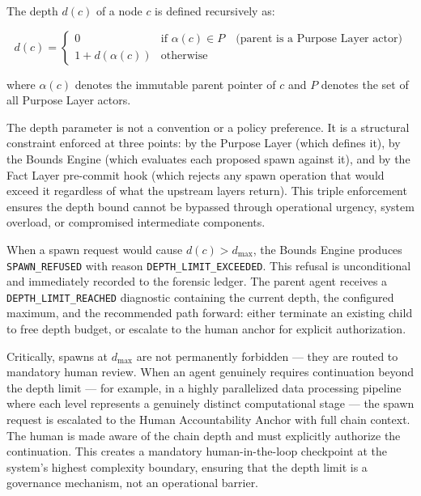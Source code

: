 The depth $d(c)$ of a node $c$ is defined recursively as:

\begin{equation}
d(c) =
\begin{cases}
0 & \text{if } \alpha(c) \in P \quad \text{(parent is a Purpose Layer actor)} \\
1 + d(\alpha(c)) & \text{otherwise}
\end{cases}
\tag{1}
\end{equation}

where $\alpha(c)$ denotes the immutable parent pointer of $c$ and $P$ denotes the set of all Purpose Layer actors.

The depth parameter is not a convention or a policy preference. It is a structural constraint enforced at three points: by the Purpose Layer (which defines it), by the Bounds Engine (which evaluates each proposed spawn against it), and by the Fact Layer pre-commit hook (which rejects any spawn operation that would exceed it regardless of what the upstream layers return). This triple enforcement ensures the depth bound cannot be bypassed through operational urgency, system overload, or compromised intermediate components.


When a spawn request would cause $d(c) > d_{\max}$, the Bounds Engine produces \texttt{SPAWN\_REFUSED} with reason \texttt{DEPTH\_LIMIT\_EXCEEDED}. This refusal is unconditional and immediately recorded to the forensic ledger. The parent agent receives a \texttt{DEPTH\_LIMIT\_REACHED} diagnostic containing the current depth, the configured maximum, and the recommended path forward: either terminate an existing child to free depth budget, or escalate to the human anchor for explicit authorization.

Critically, spawns at $d_{\max}$ are not permanently forbidden — they are routed to mandatory human review. When an agent genuinely requires continuation beyond the depth limit — for example, in a highly parallelized data processing pipeline where each level represents a genuinely distinct computational stage — the spawn request is escalated to the Human Accountability Anchor with full chain context. The human is made aware of the chain depth and must explicitly authorize the continuation. This creates a mandatory human-in-the-loop checkpoint at the system's highest complexity boundary, ensuring that the depth limit is a governance mechanism, not an operational barrier.

